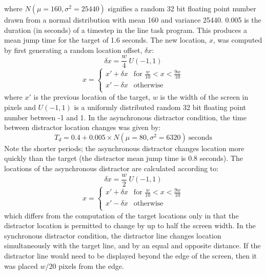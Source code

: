 \documentclass[10pt,letterpaper]{article}
\begin{document}
%
where $N(\mu=160,\sigma^2=25440)$ signifies a random 32 bit floating
point number drawn from a normal distribution with mean 160 and
variance 25440. 0.005 is the duration (in seconds) of a timestep in
the line task program. This produces a mean jump time for the target
of 1.6 seconds.  The new location, $x$, was computed by first
generating a random location offset, ${\delta}x$:
\begin{equation}\label{eq:rand_loc_offset_sync}
  {\delta}x = \frac{w}{4}~U(-1,1)
\end{equation}
\begin{equation}\label{eq:new_loc_sync}
  x=
  \begin{cases}
    x' + {\delta}x & \text{for }\frac{w}{10}<x<\frac{9w}{10}\\
    x' - {\delta}x & \text{otherwise}\\
  \end{cases}
\end{equation}
where $x'$ is the previous location of the target, $w$ is the width of
the screen in pixels and $U(-1,1)$ is a uniformly distributed random
32 bit floating point number between -1 and 1.  In the asynchronous
distractor condition, the time between distractor location changes was
given by:
%
%
\begin{equation}\label{eq:tau_distractor_async}
  T_d = 0.4 + 0.005 \times N(\mu=80,\sigma^2=6320)~\text{seconds}
\end{equation}
Note the shorter periods; the asynchronous distractor changes location
more quickly than the target (the distractor mean jump time is 0.8
seconds). The locations of the asynchronous distractor are calculated
according to:
\begin{equation}\label{eq:rand_loc_offset_async}
  {\delta}x = \frac{w}{2}~U(-1,1)
\end{equation}
\begin{equation}\label{eq:new_loc_async}
  x=
  \begin{cases}
    x' + {\delta}x & \text{for }\frac{w}{10}<x<\frac{9w}{10}\\
    x' - {\delta}x & \text{otherwise}\\
  \end{cases}
\end{equation}
which differs from the computation of the target locations only in
that the distractor location is permitted to change by up to half the
screen width.  In the synchronous distractor condition, the distractor
line changes location simultaneously with the target line, and by an
equal and opposite distance. If the distractor line would need to be
displayed beyond the edge of the screen, then it was placed $w/20$
pixels from the edge.
\end{document}
